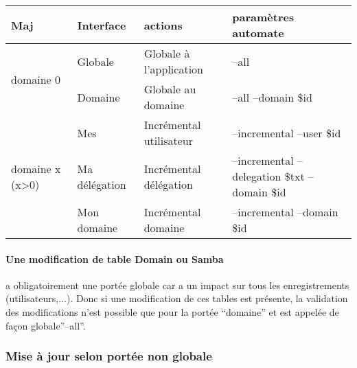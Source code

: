 \begin{tabular}{|p{}|p{}|p{}|p{}|}
\hline
\textbf{Maj} & \textbf{Interface} & \textbf{actions} & \textbf{paramètres automate} \\
\hline
\multirow{2}{2cm}{domaine 0} & Globale & Globale à l'application &
--all
\\
\cline{2-4}
& Domaine & Globale au domaine &
--all --domain \$id
\\
\hline
\multirow{3}{2cm}{domaine x (x>0)}
& Mes & Incrémental utilisateur & --incremental --user \$id
\\
\cline{2-4}
& Ma délégation & Incrémental délégation & --incremental --delegation \$txt --domain \$id
\\
\cline{2-4}
& Mon domaine & Incrémental domaine & --incremental --domain \$id
\\
\hline
\end{tabular}

\paragraph{Une modification de table Domain ou Samba} a obligatoirement une portée globale car a un impact sur tous les enregistrements (utilisateurs,...).
Donc si une modification de ces tables est présente, la validation des modifications n'est possible que pour la portée ``domaine'' et est appelée de façon globale''--all''.


\subsubsection{Mise à jour selon portée non globale}



